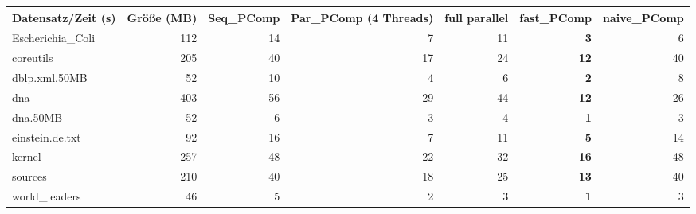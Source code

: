 \documentclass[10pt,a4paper]{standalone}
\begin{document}
	
	
	\begin{tabular}{l|r|r|r|r|r|r}
		Datensatz/Zeit (s) & Größe (MB) & Seq\_PComp & Par\_PComp (4 Threads) & full parallel & fast\_PComp & naive\_PComp \\ \hline
  Escherichia\_Coli & 112 & 14 &  7 & 11 &  \textbf{3} &  6 \\
          coreutils & 205 & 40 & 17 & 24 & \textbf{12} & 40 \\
      dblp.xml.50MB &  52 & 10 &  4 &  6 &  \textbf{2} &  8 \\
                dna & 403 & 56 & 29 & 44 & \textbf{12} & 26 \\
           dna.50MB &  52 &  6 &  3 &  4 &  \textbf{1} &  3 \\
    einstein.de.txt &  92 & 16 &  7 & 11 &  \textbf{5} & 14 \\
             kernel & 257 & 48 & 22 & 32 & \textbf{16} & 48 \\
            sources & 210 & 40 & 18 & 25 & \textbf{13} & 40 \\
     world\_leaders &  46 &  5 &  2 &  3 &  \textbf{1} &  3 \\
	\end{tabular}
\end{document}
